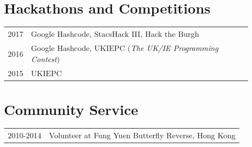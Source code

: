 \documentclass{article}
\begin{document}
\section*{Hackathons and Competitions}
\begin{tabular}{r|p{14cm}}
\textsc{2017} & Google Hashcode, StacsHack III, Hack the Burgh \\
\textsc{2016} & Google Hashcode, UKIEPC (\textit{The UK/IE Programming Contest}) \\
\textsc{2015} & UKIEPC \\
\end{tabular}
\section*{Community Service}
\begin{tabular}{r|p{14cm}}
\textsc{2010-2014} & Volunteer at Fung Yuen Butterfly Reverse, Hong Kong \\
\end{tabular}
\end{document}

